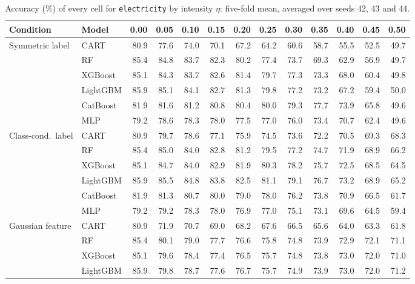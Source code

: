 \documentclass[pdflatex,sn-mathphys]{sn-jnl}
\theoremstyle{thmstyleone}
\begin{document}
\begin{table}[htbp]
\centering
\tiny
\setlength{\tabcolsep}{2.6pt}
\caption{Accuracy (\%) of every cell for \texttt{electricity} by intensity $\eta$: five-fold mean, averaged over seeds 42, 43 and 44.}
\label{tab:grid_electricity}
\begin{tabular}{@{}llrrrrrrrrrrr@{}}
\toprule
Condition & Model & 0.00 & 0.05 & 0.10 & 0.15 & 0.20 & 0.25 & 0.30 & 0.35 & 0.40 & 0.45 & 0.50 \\
\midrule
Symmetric label & CART & 80.9 & 77.6 & 74.0 & 70.1 & 67.2 & 64.2 & 60.6 & 58.7 & 55.5 & 52.5 & 49.7 \\
 & RF & 85.4 & 84.8 & 83.7 & 82.3 & 80.2 & 77.4 & 73.7 & 69.3 & 62.9 & 56.9 & 49.7 \\
 & XGBoost & 85.1 & 84.3 & 83.7 & 82.6 & 81.4 & 79.7 & 77.3 & 73.3 & 68.0 & 60.4 & 49.8 \\
 & LightGBM & 85.9 & 85.1 & 84.1 & 82.7 & 81.3 & 79.8 & 77.2 & 73.2 & 67.2 & 59.4 & 50.0 \\
 & CatBoost & 81.9 & 81.6 & 81.2 & 80.8 & 80.4 & 80.0 & 79.3 & 77.7 & 73.9 & 65.8 & 49.6 \\
 & MLP & 79.2 & 78.6 & 78.3 & 78.0 & 77.5 & 77.0 & 76.0 & 73.4 & 70.7 & 62.4 & 49.6 \\
\midrule
Class-cond.\ label & CART & 80.9 & 79.7 & 78.6 & 77.1 & 75.9 & 74.5 & 73.6 & 72.2 & 70.5 & 69.3 & 68.3 \\
 & RF & 85.4 & 85.0 & 84.0 & 82.8 & 81.2 & 79.5 & 77.2 & 74.7 & 71.9 & 68.9 & 66.2 \\
 & XGBoost & 85.1 & 84.7 & 84.0 & 82.9 & 81.9 & 80.3 & 78.2 & 75.7 & 72.5 & 68.5 & 64.5 \\
 & LightGBM & 85.9 & 85.5 & 84.8 & 83.8 & 82.5 & 81.1 & 79.1 & 76.7 & 73.2 & 68.9 & 65.2 \\
 & CatBoost & 81.9 & 81.3 & 80.7 & 80.0 & 79.0 & 78.0 & 76.2 & 73.8 & 70.9 & 66.5 & 61.7 \\
 & MLP & 79.2 & 79.2 & 78.3 & 78.0 & 76.9 & 77.0 & 75.1 & 73.1 & 69.6 & 64.5 & 59.4 \\
\midrule
Gaussian feature & CART & 80.9 & 71.9 & 70.7 & 69.0 & 68.2 & 67.6 & 66.5 & 65.6 & 64.0 & 63.3 & 61.8 \\
 & RF & 85.4 & 80.1 & 79.0 & 77.7 & 76.6 & 75.8 & 74.8 & 73.9 & 72.9 & 72.1 & 71.1 \\
 & XGBoost & 85.1 & 79.6 & 78.4 & 77.4 & 76.5 & 75.7 & 74.8 & 73.8 & 73.0 & 72.0 & 71.0 \\
 & LightGBM & 85.9 & 79.8 & 78.7 & 77.6 & 76.7 & 75.7 & 74.9 & 73.9 & 73.0 & 72.0 & 71.2 \\

\end{tabular}
\end{table}
\end{document}
